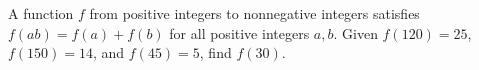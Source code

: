 A function $f$ from positive integers to nonnegative integers satisfies $f(ab)=f(a)+f(b)$ for all positive integers $a,b$. Given $f(120)=25$, $f(150)=14$, and $f(45)=5$, find $f(30)$.
